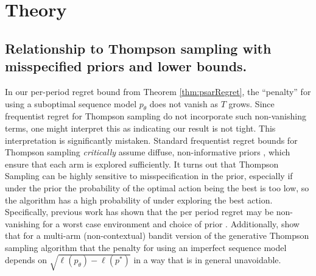 
\section{Theory}

\subsection{Relationship to Thompson sampling with misspecified priors and lower bounds.}
\label{app:misspecifiedPriors}

In our per-period regret bound from Theorem \ref{thm:psarRegret}, the ``penalty'' for using a suboptimal sequence model $p_\theta$ does not vanish as $T$ grows. 
Since frequentist regret for Thompson sampling do not incorporate such non-vanishing terms, one might interpret this as indicating our result is not tight. This interpretation is significantly mistaken. Standard frequentist regret bounds for Thompson sampling \textit{critically} assume diffuse, non-informative priors \citep{agrawal2012analysis,agrawal2013thompson}, which ensure that each arm is explored sufficiently. It turns out that Thompson Sampling can be highly sensitive to misspecification in the prior, especially if under the prior the probability of the optimal action being the best is too low, so the algorithm has a high probability of under exploring the best action. Specifically, previous work has shown that the per period regret may be non-vanishing for a worst case environment and choice of prior \citep{liu2016prior,simchowitz2021bayesian}. Additionally, \citet{psar2024} show that for a multi-arm (non-contextual) bandit version of the generative Thompson sampling algorithm that the penalty for using an imperfect sequence model depends on $\sqrt{\ell(p_\theta) - \ell(p^*)}$ in a way that is in general unavoidable.



